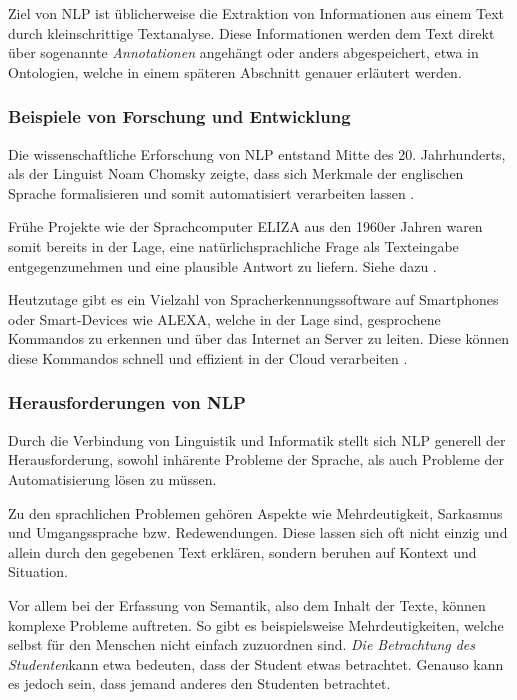 \documentclass[12pt]{report}
\begin{document}
Ziel von NLP ist üblicherweise die Extraktion von Informationen aus einem Text durch kleinschrittige Textanalyse. Diese Informationen werden dem Text direkt über sogenannte \textit{Annotationen} angehängt oder anders abgespeichert, etwa in Ontologien, welche in einem späteren Abschnitt genauer erläutert werden.

\subsubsection{Beispiele von Forschung und Entwicklung}
Die wissenschaftliche Erforschung von NLP entstand Mitte des 20. Jahrhunderts, als der Linguist Noam Chomsky zeigte, dass sich Merkmale der englischen Sprache formalisieren und somit automatisiert verarbeiten lassen \cite{cho57}. 

Frühe Projekte wie der Sprachcomputer ELIZA aus den 1960er Jahren waren somit bereits in der Lage, eine natürlichsprachliche Frage als Texteingabe entgegenzunehmen und eine plausible Antwort zu liefern. Siehe dazu \cite{wei66}.  

Heutzutage gibt es ein Vielzahl von Spracherkennungssoftware auf Smartphones oder Smart-Devices wie ALEXA, welche in der Lage sind, gesprochene Kommandos zu erkennen und über das Internet an Server zu leiten. Diese können diese Kommandos schnell und effizient in der Cloud verarbeiten \cite{hao14}.

\subsubsection{Herausforderungen von NLP}
Durch die Verbindung von Linguistik und Informatik stellt sich NLP generell der Herausforderung, sowohl inhärente Probleme der Sprache, als auch Probleme der Automatisierung lösen zu müssen. 

Zu den sprachlichen Problemen gehören Aspekte wie Mehrdeutigkeit, Sarkasmus und Umgangssprache bzw. Redewendungen. Diese lassen sich oft nicht einzig und allein durch den gegebenen Text erklären, sondern beruhen auf Kontext und Situation.

Vor allem bei der Erfassung von Semantik, also dem Inhalt der Texte, können komplexe Probleme auftreten. So gibt es beispielsweise Mehrdeutigkeiten, welche selbst für den Menschen nicht einfach zuzuordnen sind. \glqq \textit{Die Betrachtung des Studenten}\grqq kann etwa bedeuten, dass der Student etwas betrachtet. Genauso kann es jedoch sein, dass jemand anderes den Studenten betrachtet. 
\end{document}
